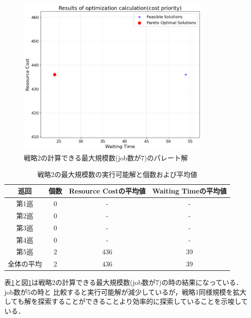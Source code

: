 \begin{figure}[H]
    \centering
    \includegraphics[width=0.8\linewidth, height=8cm]{./images/cost_job7.png}
    \caption{戦略2の計算できる最大規模数(job数が7)のパレート解}
    \label{fig:fig8}
\end{figure}

\begin{table}[ht]
    \centering
    \vspace{-0.3cm}
    \caption{戦略2の最大規模数の実行可能解と個数および平均値}
    \begin{tabular}{|c|c|c|c|}
        \hline
         巡回 & 個数 & Resource Costの平均値 & Waiting Timeの平均値 \\
        \hline
        第1巡 & 0 & - & - \\
        \hline
        第2巡 & 0 & - & - \\
        \hline
        第3巡 & 0 & - & - \\
        \hline
        第4巡 & 0 & - & - \\
        \hline
        第5巡 & 2 & 436 & 39 \\
        \hline
        全体の平均 & 2 & 436 & 39 \\
        \hline
    \end{tabular}
    \label{tab:cost_feasible_max}
\end{table}

表\ref{tab:cost_feasible_max}と図\ref{fig:fig8}は戦略2の計算できる最大規模数(job数が7)の時の結果になっている．job数が5の時と
比較すると実行可能解が減少しているが，戦略1同様規模を拡大しても解を探索することができることより効率的に探索していることを示唆している．

